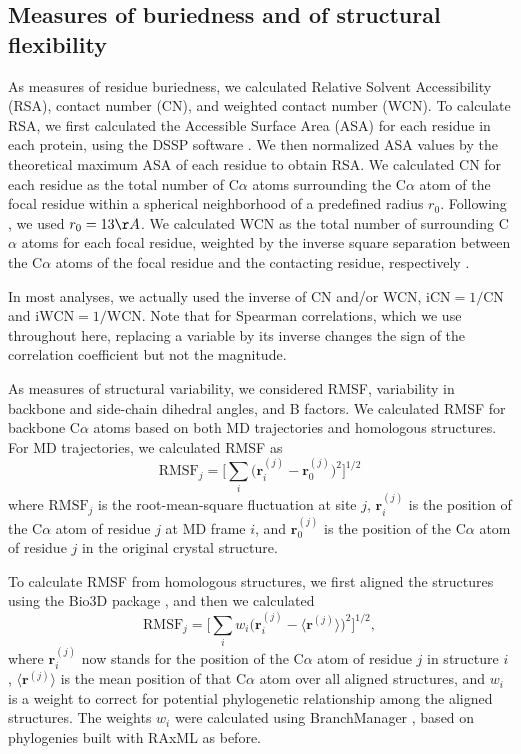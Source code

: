 \documentclass[12pt]{article}
\begin{document}
\subsection*{Measures of buriedness and of structural flexibility}

As measures of residue buriedness, we calculated Relative Solvent Accessibility (RSA), contact number (CN), and weighted contact number (WCN). To calculate RSA, we first calculated the Accessible Surface Area (ASA) for each residue in each protein, using the DSSP software \citep{KabschSander1983}. We then normalized ASA values by the theoretical maximum ASA of each residue \citep{Tienetal2013} to obtain RSA. We calculated CN for each residue as the total number of C$\alpha$ atoms surrounding the  C$\alpha$ atom of the focal residue within a spherical neighborhood of a predefined radius $r_0$. Following \citet{Yehetal2014}, we used $r_0=13\AA$. We calculated WCN as the total number of surrounding C$\alpha$ atoms for each focal residue, weighted by the inverse square separation between the C$\alpha$ atoms of the focal residue and the contacting residue, respectively \citep{Shihetal2012}.

In most analyses, we actually used the inverse of CN and/or WCN, $\text{iCN}=1/\text{CN}$ and $\text{iWCN}=1/\text{WCN}$. Note that for Spearman correlations, which we use throughout here, replacing a variable by its inverse changes the sign of the correlation coefficient but not the magnitude.

As measures of structural variability, we considered RMSF, variability in backbone and side-chain dihedral angles, and B factors. We calculated RMSF for backbone C$\alpha$ atoms based on both MD trajectories and homologous structures. For MD trajectories, we calculated RMSF as
\begin{equation}
    \text{RMSF}_j = \Big[\sum_i \big(\mathbf{r}_i^{(j)}-\mathbf{r}_0^{(j)}\big)^2\Big]^{1/2}
\end{equation}
where $\text{RMSF}_j$ is the root-mean-square fluctuation at site $j$, $\mathbf{r}_i^{(j)}$ is the position of the C$\alpha$ atom of residue $j$ at MD frame $i$, and $\mathbf{r}_0^{(j)}$ is the position of the C$\alpha$ atom of residue $j$ in the original crystal structure.

To calculate RMSF from homologous structures, we first aligned the structures using the Bio3D package \citep{Grantetal2006}, and then we calculated
\begin{equation}
    \text{RMSF}_j = \Big[\sum_i w_i\big(\mathbf{r}_i^{(j)}-\langle\mathbf{r}^{(j)}\rangle\big)^2\Big]^{1/2},
\end{equation}
where $\mathbf{r}_i^{(j)}$ now stands for the position of the C$\alpha$ atom of residue $j$ in structure $i$, $\langle\mathbf{r}^{(j)}\rangle$ is the mean position of that C$\alpha$ atom over all aligned structures, and $w_i$ is a weight to correct for potential phylogenetic relationship among the aligned structures. The weights $w_i$ were calculated using BranchManager \citep{Stone2007}, based on phylogenies built with RAxML as before.
\end{document}

